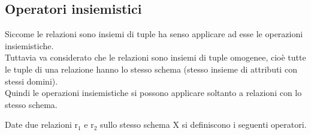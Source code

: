 \documentclass[12pt, a4paper, oneside]{book}
\begin{document}
    \subsection{Operatori insiemistici}
    Siccome le relazioni sono insiemi di tuple ha senso applicare ad esse le operazioni insiemistiche.\\[0.2ex]
    Tuttavia va considerato che le relazioni sono insiemi di tuple omogenee, cioè tutte le tuple di una relazione hanno lo stesso schema (stesso insieme di attributi con stessi domini).\\[0.2ex]
    Quindi le operazioni insiemistiche si possono applicare soltanto a relazioni con lo stesso schema.

    Date due relazioni $\mathrm{r_1}$ e $\mathrm{r_2}$ sullo stesso schema $\mathrm{X}$ si definiscono i seguenti operatori.


\end{document}
